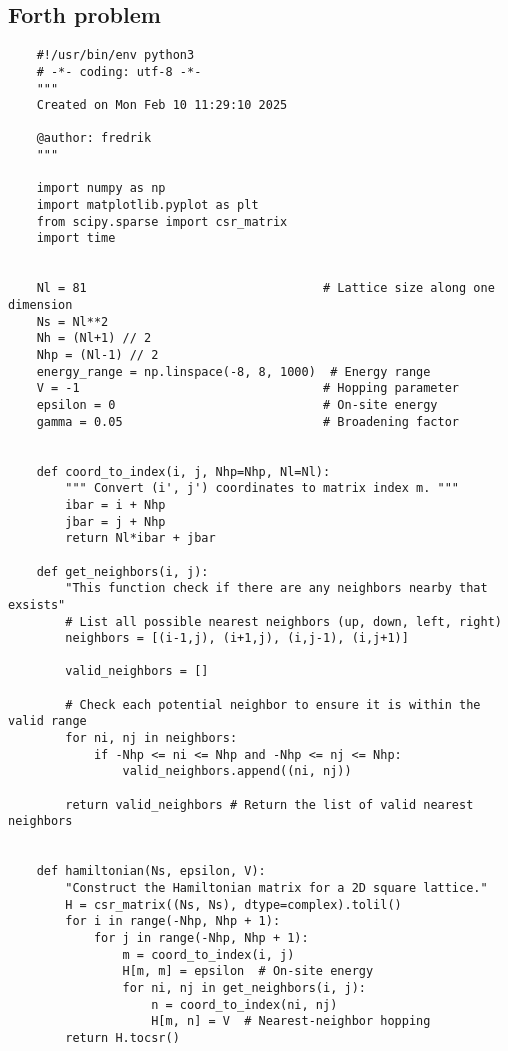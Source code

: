 \subsection{Forth problem}
\begin{verbatim}
    #!/usr/bin/env python3
    # -*- coding: utf-8 -*-
    """
    Created on Mon Feb 10 11:29:10 2025
    
    @author: fredrik
    """
    
    import numpy as np
    import matplotlib.pyplot as plt
    from scipy.sparse import csr_matrix
    import time  
    
    
    Nl = 81                                 # Lattice size along one dimension
    Ns = Nl**2     
    Nh = (Nl+1) // 2
    Nhp = (Nl-1) // 2
    energy_range = np.linspace(-8, 8, 1000)  # Energy range
    V = -1                                  # Hopping parameter
    epsilon = 0                             # On-site energy
    gamma = 0.05                            # Broadening factor
    
    
    def coord_to_index(i, j, Nhp=Nhp, Nl=Nl):
        """ Convert (i', j') coordinates to matrix index m. """
        ibar = i + Nhp
        jbar = j + Nhp
        return Nl*ibar + jbar
    
    def get_neighbors(i, j):
        "This function check if there are any neighbors nearby that exsists"
        # List all possible nearest neighbors (up, down, left, right)
        neighbors = [(i-1,j), (i+1,j), (i,j-1), (i,j+1)]   
        
        valid_neighbors = []
    
        # Check each potential neighbor to ensure it is within the valid range
        for ni, nj in neighbors:
            if -Nhp <= ni <= Nhp and -Nhp <= nj <= Nhp:
                valid_neighbors.append((ni, nj))  
    
        return valid_neighbors # Return the list of valid nearest neighbors
    
    
    def hamiltonian(Ns, epsilon, V):
        "Construct the Hamiltonian matrix for a 2D square lattice."
        H = csr_matrix((Ns, Ns), dtype=complex).tolil()
        for i in range(-Nhp, Nhp + 1):
            for j in range(-Nhp, Nhp + 1):
                m = coord_to_index(i, j)
                H[m, m] = epsilon  # On-site energy
                for ni, nj in get_neighbors(i, j):
                    n = coord_to_index(ni, nj)
                    H[m, n] = V  # Nearest-neighbor hopping
        return H.tocsr()
    

\end{verbatim}
